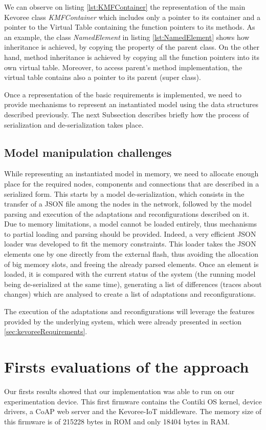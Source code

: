 We can observe on listing \ref{lst:KMFContainer} the representation of the main Kevoree class \textit{KMFContainer} which includes only a pointer to its container and a pointer to the Virtual Table containing the function pointers to its methods.
As an example, the class \textit{NamedElement} in listing \ref{lst:NamedElement} shows how inheritance is achieved, by copying the property of the parent class.
On the other hand, method inheritance is achieved by copying all the function pointers into its own virtual table. 
Moreover, to access parent's method implementation, the virtual table contains also a pointer to its parent (super class).

Once a representation of the basic requirements is implemented, we need to provide mechanisms to represent an instantiated model using the data structures described previously.
The next Subsection describes briefly how the process of serialization and de-serialization takes place.

\subsection{Model manipulation challenges}
While representing an instantiated model in memory, we need to allocate enough place for the required nodes, components and connections that are described in a serialized form.
This starts by a model de-serialization, which consists in the transfer of a JSON file among the nodes in the network, followed by the model parsing and execution of the adaptations and reconfigurations described on it.
Due to memory limitations, a model cannot be loaded entirely, thus mechanisms to partial loading and parsing should be provided.
Indeed, a very efficient JSON loader was developed to fit the memory constraints.
This loader takes the JSON elements one by one directly from the external flash, thus avoiding the allocation of big memory slots, and freeing the already parsed elements.
Once an element is loaded, it is compared with the current status of the system (the running model being de-serialized at the same time), generating a list of differences (traces about changes) which are analysed to create a list of adaptations and reconfigurations.

The execution of the adaptations and reconfigurations will leverage the features provided by the underlying system, which were already presented in section \ref{sec:kevoreeRequirements}.

\section{Firsts evaluations of the approach}
Our firsts results showed that our implementation was able to run on our experimentation device.
This first firmware contains the Contiki OS kernel, device drivers, a CoAP web server and the Kevoree-IoT middleware.
The memory size of this firmware is of 215228 bytes in ROM and only 18404 bytes in RAM.%

